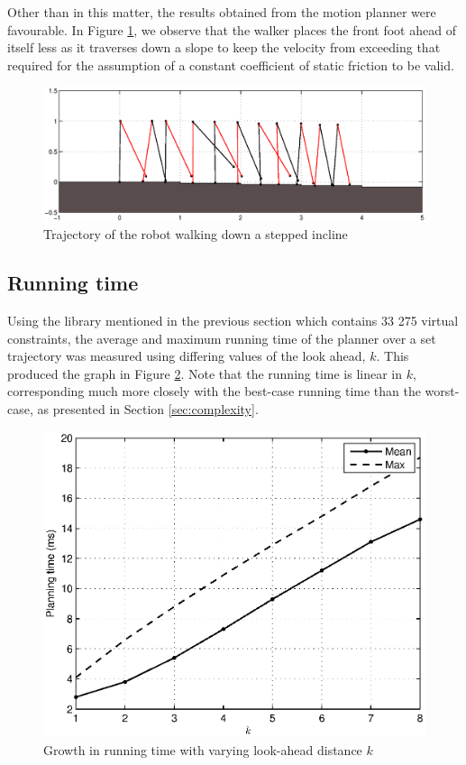 Other than in this matter, the results obtained from the motion planner were favourable. In Figure \ref{fig:slowdown}, we observe that the walker places the front foot ahead of itself less as it traverses down a slope to keep the velocity from exceeding that required for the assumption of a constant coefficient of static friction to be valid.

\begin{figure}
\centering
\includegraphics[width=\linewidth]{7Results/slowdown}
\caption{Trajectory of the robot walking down a stepped incline}
\label{fig:slowdown}
\end{figure}

\subsection{Running time}
Using the library mentioned in the previous section which contains 33 275 virtual constraints, the average and maximum running time of the planner over a set trajectory was measured using differing values of the look ahead, $k$. This produced the graph in Figure \ref{fig:lookahead}. Note that the running time is linear in $k$, corresponding much more closely with the best-case running time than the worst-case, as presented in Section \ref{sec:complexity}.

\begin{figure}
\centering
\includegraphics[width=0.8\linewidth]{7Results/lookahead}
\caption{Growth in running time with varying look-ahead distance $k$}
\label{fig:lookahead}
\end{figure}

